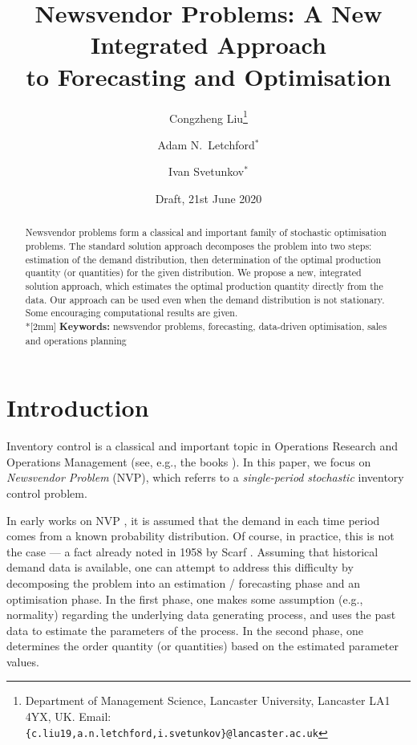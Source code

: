 \documentclass{article}
\title{Newsvendor Problems: A New Integrated Approach\\ to Forecasting and Optimisation}
\author{Congzheng Liu\thanks{Department of Management Science,
Lancaster University, Lancaster LA1 4YX, UK.
Email: {\tt \{c.liu19,a.n.letchford,i.svetunkov\}@lancaster.ac.uk}}
\and Adam N.\ Letchford$^*$ \and Ivan Svetunkov$^*$} %
\date{Draft, 21st June 2020}
\begin{document}
\maketitle

\begin{abstract}
Newsvendor problems form a classical and important family of stochastic optimisation problems. The standard solution approach decomposes the problem into two steps: estimation of the demand distribution, then determination of the optimal production quantity (or quantities) for the given distribution. We propose a new, integrated solution approach, which estimates the optimal production quantity directly from the data. Our approach can be used even when the demand distribution is not stationary. Some encouraging computational results are given. 
\\*[2mm]
{\bf Keywords:} newsvendor problems, forecasting, data-driven optimisation, sales and operations planning
\end{abstract}


\section{Introduction}

Inventory control is a classical and important topic in Operations Research and Operations Management (see, e.g., the books \cite{Po02,SPP98,Zi00}). In this paper, we focus on \emph{Newsvendor Problem} (NVP), which referrs to a \emph{single-period} \emph{stochastic} inventory control problem.

In early works on NVP \cite{AHM51,MK51}, it is assumed that the demand in each time period comes from a known probability distribution. Of course, in practice, this is not the case --- a fact already noted in 1958 by Scarf \cite{Sc58}. Assuming that historical demand data is available, one can attempt to address this difficulty by decomposing the problem into an estimation / forecasting phase and an optimisation phase.
In the first phase, one makes some assumption (e.g., normality) regarding the underlying data generating process, and uses the past data to estimate the parameters of the process.
In the second phase, one determines the order quantity (or quantities) based on the estimated parameter values.
\end{document}
